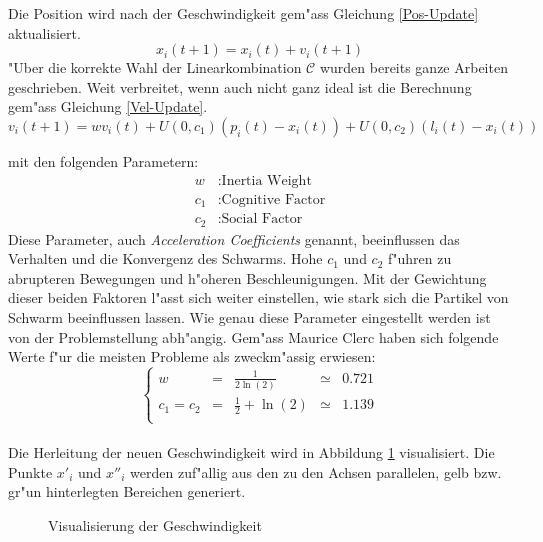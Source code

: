 Die Position wird nach der Geschwindigkeit gem"ass Gleichung
\ref{Pos-Update} aktualisiert. \\
\begin{equation}
	x_{i}(t+1) = x_i(t) + v_i(t+1) \label{Pos-Update}
\end{equation}
"Uber die korrekte Wahl der Linearkombination $\mathcal{C}$ wurden bereits
ganze Arbeiten geschrieben. Weit verbreitet, wenn auch nicht ganz ideal
ist die Berechnung gem"ass Gleichung \ref{Vel-Update}. \\
\begin{equation}
	v_i(t+1) = w v_i(t) + U(0,c_1) (p_i(t)-x_i(t)) + U(0,c_2) (l_i(t)-x_i(t))\label{Vel-Update}
\end{equation}

mit den folgenden Parametern:
\begin{align*}
	w &: \text{Inertia Weight} \\
	c_1 &: \text{Cognitive Factor} \\
	c_2 &: \text{Social Factor}
\end{align*}
Diese Parameter, auch \textit{Acceleration Coefficients} genannt,
beeinflussen das  Verhalten und die Konvergenz des Schwarms. Hohe
$c_1$ und $c_2$ f"uhren zu abrupteren Bewegungen und h"oheren
Beschleunigungen. Mit der Gewichtung dieser beiden Faktoren l"asst sich
weiter einstellen, wie stark sich die Partikel von Schwarm beeinflussen
lassen. Wie genau diese Parameter eingestellt werden ist von der
Problemstellung abh"angig. Gem"ass Maurice Clerc \cite{Clerc-Stagnation}
haben sich folgende Werte f"ur die meisten Probleme als zweckm"assig
erwiesen:
\begin{equation}
	\left\lbrace \begin{array}{lllll}
		w & = & \frac{1}{2 \ln(2)} & \simeq & 0.721 \\
		c_1 = c_2 & = & \frac{1}{2} + \ln(2) & \simeq & 1.139 \\
	\end{array}	\right. 
\end{equation} \\


Die Herleitung der neuen Geschwindigkeit wird in Abbildung
\ref{Fig-Visualisierung-Geschwindigkeit} visualisiert. Die Punkte $x'_i$
und $x''_i$ werden zuf"allig aus den zu den Achsen parallelen, gelb
bzw. gr"un hinterlegten Bereichen generiert.  \\
\begin{figure}[htbp]
	\centering
	
	\caption{Visualisierung der Geschwindigkeit}
	\label{Fig-Visualisierung-Geschwindigkeit}
\end{figure}


